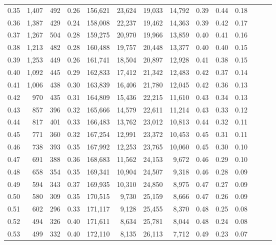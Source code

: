 \begin{tabular}{rrrrrrrrrrrrrr}
0.35 &  1,407 &  492 &  0.26 &  156,621 &   23,624 &  19,033 &  14,792 &  0.39 &  0.44 &      0.18 \\
0.36 &  1,387 &  429 &  0.24 &  158,008 &   22,237 &  19,462 &  14,363 &  0.39 &  0.42 &      0.17 \\
0.37 &  1,267 &  504 &  0.28 &  159,275 &   20,970 &  19,966 &  13,859 &  0.40 &  0.41 &      0.16 \\
0.38 &  1,213 &  482 &  0.28 &  160,488 &   19,757 &  20,448 &  13,377 &  0.40 &  0.40 &      0.15 \\
0.39 &  1,253 &  449 &  0.26 &  161,741 &   18,504 &  20,897 &  12,928 &  0.41 &  0.38 &      0.15 \\
0.40 &  1,092 &  445 &  0.29 &  162,833 &   17,412 &  21,342 &  12,483 &  0.42 &  0.37 &      0.14 \\
0.41 &  1,006 &  438 &  0.30 &  163,839 &   16,406 &  21,780 &  12,045 &  0.42 &  0.36 &      0.13 \\
0.42 &    970 &  435 &  0.31 &  164,809 &   15,436 &  22,215 &  11,610 &  0.43 &  0.34 &      0.13 \\
0.43 &    857 &  396 &  0.32 &  165,666 &   14,579 &  22,611 &  11,214 &  0.43 &  0.33 &      0.12 \\
0.44 &    817 &  401 &  0.33 &  166,483 &   13,762 &  23,012 &  10,813 &  0.44 &  0.32 &      0.11 \\
0.45 &    771 &  360 &  0.32 &  167,254 &   12,991 &  23,372 &  10,453 &  0.45 &  0.31 &      0.11 \\
0.46 &    738 &  393 &  0.35 &  167,992 &   12,253 &  23,765 &  10,060 &  0.45 &  0.30 &      0.10 \\
0.47 &    691 &  388 &  0.36 &  168,683 &   11,562 &  24,153 &   9,672 &  0.46 &  0.29 &      0.10 \\
0.48 &    658 &  354 &  0.35 &  169,341 &   10,904 &  24,507 &   9,318 &  0.46 &  0.28 &      0.09 \\
0.49 &    594 &  343 &  0.37 &  169,935 &   10,310 &  24,850 &   8,975 &  0.47 &  0.27 &      0.09 \\
0.50 &    580 &  309 &  0.35 &  170,515 &    9,730 &  25,159 &   8,666 &  0.47 &  0.26 &      0.09 \\
0.51 &    602 &  296 &  0.33 &  171,117 &    9,128 &  25,455 &   8,370 &  0.48 &  0.25 &      0.08 \\
0.52 &    494 &  326 &  0.40 &  171,611 &    8,634 &  25,781 &   8,044 &  0.48 &  0.24 &      0.08 \\
0.53 &    499 &  332 &  0.40 &  172,110 &    8,135 &  26,113 &   7,712 &  0.49 &  0.23 &      0.07 \\

\end{tabular}
